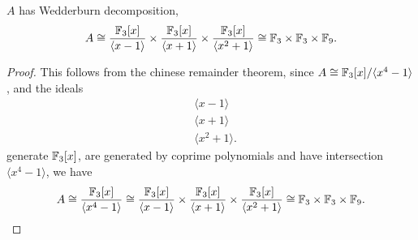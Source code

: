 \documentclass{unswmaths}
\begin{document}
\begin{theorem}
\label{extWeddDecomp}
    $A$ has Wedderburn decomposition,
    \begin{equation*}
        A \cong \frac{{\mathbb{F}_3}[x]}{\langle x-1\rangle}\times\frac{{\mathbb{F}_3}[x]}{\langle x+1\rangle}\times\frac{{\mathbb{F}_3}[x]}{\langle x^2+1\rangle} \cong {\mathbb{F}_3}\times{\mathbb{F}_3}\times\mathbb{F}_9.
    \end{equation*}
\end{theorem}
\begin{proof}
    This follows from the chinese remainder theorem, since $A\cong {\mathbb{F}_3}[x]/\langle x^4-1\rangle$, and
    the ideals
    \begin{align*}
        &\langle x-1\rangle\\
        &\langle x+1\rangle\\
        &\langle x^2+1\rangle.
    \end{align*}
    generate ${\mathbb{F}_3}[x]$, are generated by coprime polynomials and have intersection $\langle x^4-1\rangle$, we have
    \begin{equation*}
        A \cong \frac{{\mathbb{F}_3}[x]}{\langle x^4-1\rangle} \cong \frac{{\mathbb{F}_3}[x]}{\langle x-1\rangle}\times \frac{{\mathbb{F}_3}[x]}{\langle x+1\rangle}\times\frac{{\mathbb{F}_3}[x]}{\langle x^2+1\rangle} \cong {\mathbb{F}_3}\times{\mathbb{F}_3}\times\mathbb{F}_9.
    \end{equation*}
\end{proof}
\end{document}
